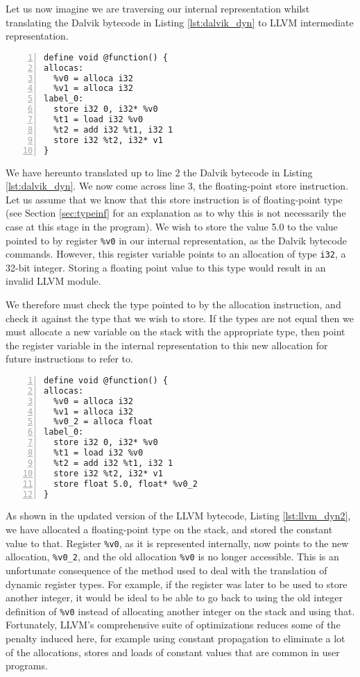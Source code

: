 Let us now imagine we are traversing our internal representation whilst translating the Dalvik bytecode in Listing \ref{lst:dalvik_dyn} to LLVM intermediate representation.

\begin{lstlisting}[frame=single, numbers=left, numberstyle=\tiny, caption={LLVM IR}, label=lst:llvm_dyn] 
define void @function() {
allocas:
  %v0 = alloca i32
  %v1 = alloca i32
label_0:
  store i32 0, i32* %v0
  %t1 = load i32 %v0
  %t2 = add i32 %t1, i32 1
  store i32 %t2, i32* v1
}
\end{lstlisting}

We have hereunto translated up to line 2 the Dalvik bytecode in Listing \ref{lst:dalvik_dyn}. We now come across line 3, the floating-point store instruction. Let us assume that we know that this store instruction is of floating-point type (see Section \ref{sec:typeinf} for an explanation as to why this is not necessarily the case at this stage in the program). We wish to store the value 5.0 to the value pointed to by register \verb|%v0| in our internal representation, as the Dalvik bytecode commands. However, this register variable points to an allocation of type \verb|i32|, a 32-bit integer. Storing a floating point value to this type would result in an invalid LLVM module.

We therefore must check the type pointed to by the allocation instruction, and check it against the type that we wish to store. If the types are not equal then we must allocate a new variable on the stack with the appropriate type, then point the register variable in the internal representation to this new allocation for future instructions to refer to.

\begin{lstlisting}[frame=single, numbers=left, numberstyle=\tiny, caption={LLVM IR}, label=lst:llvm_dyn2]
define void @function() {
allocas:
  %v0 = alloca i32
  %v1 = alloca i32
  %v0_2 = alloca float
label_0:
  store i32 0, i32* %v0
  %t1 = load i32 %v0
  %t2 = add i32 %t1, i32 1
  store i32 %t2, i32* v1
  store float 5.0, float* %v0_2
}
\end{lstlisting}

As shown in the updated version of the LLVM bytecode, Listing \ref{lst:llvm_dyn2}, we have allocated a floating-point type on the stack, and stored the constant value to that. Register \verb|%v0|, as it is represented internally, now points to the new allocation, \verb|%v0_2|, and the old allocation \verb|%v0| is no longer accessible. This is an unfortunate consequence of the method used to deal with the translation of dynamic register types. For example, if the register was later to be used to store another integer, it would be ideal to be able to go back to using the old integer definition of \verb|%v0| instead of allocating another integer on the stack and using that. Fortunately, LLVM's comprehensive suite of optimizations reduces some of the penalty induced here, for example using constant propagation to eliminate a lot of the allocations, stores and loads of constant values that are common in user programs.

